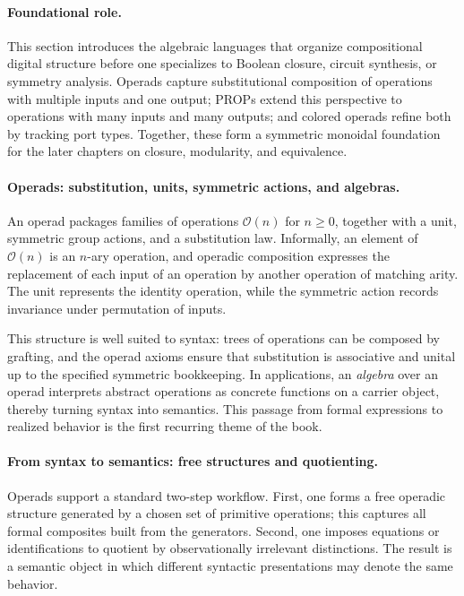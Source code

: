 \paragraph{Foundational role.}
This section introduces the algebraic languages that organize compositional digital structure before one specializes to Boolean closure, circuit synthesis, or symmetry analysis. Operads capture substitutional composition of operations with multiple inputs and one output; PROPs extend this perspective to operations with many inputs and many outputs; and colored operads refine both by tracking port types. Together, these form a symmetric monoidal foundation for the later chapters on closure, modularity, and equivalence.

\paragraph{Operads: substitution, units, symmetric actions, and algebras.}
An operad packages families of operations \(\mathcal{O}(n)\) for \(n \ge 0\), together with a unit, symmetric group actions, and a substitution law. Informally, an element of \(\mathcal{O}(n)\) is an \(n\)-ary operation, and operadic composition expresses the replacement of each input of an operation by another operation of matching arity. The unit represents the identity operation, while the symmetric action records invariance under permutation of inputs.

This structure is well suited to syntax: trees of operations can be composed by grafting, and the operad axioms ensure that substitution is associative and unital up to the specified symmetric bookkeeping. In applications, an \emph{algebra} over an operad interprets abstract operations as concrete functions on a carrier object, thereby turning syntax into semantics. This passage from formal expressions to realized behavior is the first recurring theme of the book.

\paragraph{From syntax to semantics: free structures and quotienting.}
Operads support a standard two-step workflow. First, one forms a free operadic structure generated by a chosen set of primitive operations; this captures all formal composites built from the generators. Second, one imposes equations or identifications to quotient by observationally irrelevant distinctions. The result is a semantic object in which different syntactic presentations may denote the same behavior.


